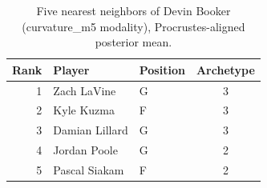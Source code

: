 \begin{table}[htbp]
  \centering\small
  \begin{tabular}{rllc}
    \toprule
    Rank & Player & Position & Archetype \\
    \midrule
    1 & Zach LaVine & G & 3 \\
    2 & Kyle Kuzma & F & 3 \\
    3 & Damian Lillard & G & 3 \\
    4 & Jordan Poole & G & 2 \\
    5 & Pascal Siakam & F & 2 \\
    \bottomrule
  \end{tabular}
  \caption{Five nearest neighbors of Devin Booker (curvature_m5 modality), Procrustes-aligned posterior mean.}
  \label{tab:Devin_Booker_neighbors_curvature_m5}
\end{table}

